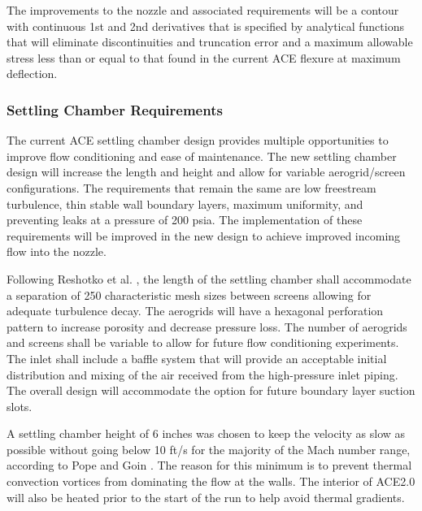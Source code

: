 The improvements to the nozzle and associated requirements will be a contour with continuous 1st and 2nd derivatives that is specified by analytical functions that will eliminate discontinuities and truncation error and a maximum allowable stress less than or equal to that found in the current ACE flexure at maximum deflection.

\subsubsection*{Settling Chamber Requirements}

The current ACE settling chamber design provides multiple opportunities to improve flow conditioning and ease of maintenance. The new settling chamber design will increase the length and height and allow for variable aerogrid/screen configurations. The requirements that remain the same are low freestream turbulence, thin stable wall boundary layers, maximum uniformity, and preventing leaks at a pressure of 200 psia. The implementation of these requirements will be improved in the new design to achieve improved incoming flow into the nozzle.

Following Reshotko et al. \cite{reshotko}, the length of the settling chamber shall accommodate a separation of 250 characteristic mesh sizes between screens allowing for adequate turbulence decay. The aerogrids will have a hexagonal perforation pattern to increase porosity and decrease pressure loss. The number of aerogrids and screens shall be variable to allow for future flow conditioning experiments. The inlet shall include a baffle system that will provide an acceptable initial distribution and mixing of the air received from the high-pressure inlet piping. The overall design will accommodate the option for future boundary layer suction slots.

A settling chamber height of 6 inches was chosen to keep the velocity as slow as possible without going below 10 ft/s for the majority of the Mach number range, according to Pope and Goin \cite{pope}. The reason for this minimum is to prevent thermal convection vortices from dominating the flow at the walls. The interior of ACE2.0 will also be heated prior to the start of the run to help avoid thermal gradients. 


